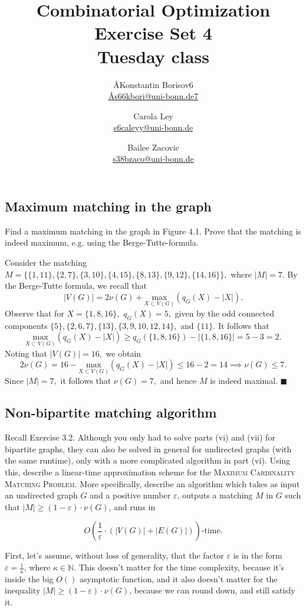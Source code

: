 \documentclass{article}
\title{Combinatorial Optimization \\ Exercise Set 4 \\ Tuesday class}
\author{
  \AA{Konstantin Borisov}{6} \\
  \href{mailto:\AA{s66kbori@uni-bonn.de}{7}}{\AA{s66kbori@uni-bonn.de}{7}}
  \and
  Carola Ley \\
  \href{mailto:s6caleyy@uni-bonn.de}{s6caleyy@uni-bonn.de}
  \and
  Bailee Zacovic \\
  \href{mailto:s38bzaco@uni-bonn.de}{s38bzaco@uni-bonn.de}
}
\let\epsilon\varepsilon
\newcommand{\N}{\mathbb{N}}
\begin{document}
  \maketitle

  \setcounter{section}{4}
  \subsection{Maximum matching in the graph}
  \begin{centerframebox}
    Find a maximum matching in the graph in Figure 4.1. Prove that
    the matching is indeed maximum, e.g. using the Berge-Tutte-formula.
  \end{centerframebox}
  Consider the matching $M=\{\{1,11\},\{2,7\},\{3,10\},\{4,15\},\{8,13\},\{9,12\},\{14,16\}\},$ where $|M|=7.$ By the Berge-Tutte formula, we recall that $$|V(G)|=2\nu(G)+\underset{X\subset V(G)}{\text{max}}(q_G(X)-|X|).$$Observe that for $X=\{1,8,16\},$ $q_G(X)=5,$ given by the odd connected components $\{5\},\{2,6,7\},\{13\},\{3,9,10,12,14\},$ and $\{11\}.$ It follows that $$\underset{X\subset V(G)}{\text{max}}(q_G(X)-|X|)\geq q_G(\{1,8,16\})-|\{1,8,16\}|=5-3=2.$$ Noting that $|V(G)|=16,$ we obtain
  $$2\nu(G)=16-\underset{X\subset V(G)}{\text{max}}(q_G(X)-|X|)\leq 16-2=14\implies \nu(G)\leq 7.$$ Since $|M|=7,$ it follows that $\nu(G)=7,$ and hence $M$ is indeed maximal. $\blacksquare$

  \subsection{Non-bipartite matching algorithm}
  \begin{centerframebox}
    Recall Exercise 3.2. Although you only had to solve parts (vi)
    and (vii) for bipartite graphs, they can also be solved in general for undirected
    graphs (with the same runtime), only with a more complicated algorithm in part
    (vi). Using this, describe a linear-time approximation scheme for the \textsc{Maximum
    Cardinality Matching Problem}. More specifically, describe an algorithm
    which takes as input an undirected graph $G$ and a positive number $\epsilon$, outputs a
    matching $M$ in $G$ such that $|M| \geq (1 - \epsilon) \cdot \nu(G)$, and runs in

    $$ O\left(\frac{1}{\epsilon} \cdot (|V (G)| + |E(G)|) \right)\textrm{-time.} $$
  \end{centerframebox}
  First, let's assume, without loss of generality, that the factor $\epsilon$ is in the form $\epsilon = \frac{1}{\kappa}$, where $\kappa \in \N$.
  This doesn't matter for the time complexity, because it's inside the big $O()$ asymptotic function,
  and it also doesn't matter for the inequality $|M| \geq (1 - \epsilon) \cdot \nu(G)$, because we can round down, and still satisfy it.
\end{document}
